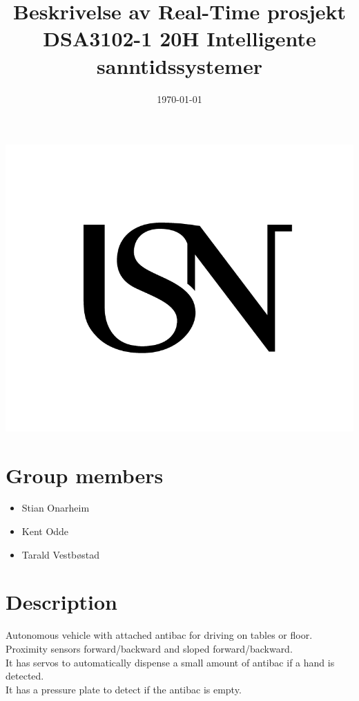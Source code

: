 \documentclass{article}
\title{Beskrivelse av Real-Time prosjekt \large\\
DSA3102-1 20H Intelligente sanntidssystemer}
\date{\today}
\begin{document}
\maketitle
\thispagestyle{empty}
\begin{center}
\includegraphics[width=\linewidth,height=0.2\textheight,keepaspectratio]{USN.png}
\end{center}


\newpage
\section{Group members}
	\begin{itemize}
		\item{Stian Onarheim}
		\item{Kent Odde}
		\item{Tarald Vestbøstad}
	\end{itemize}
\section{Description}
	Autonomous vehicle with attached antibac for driving on tables or floor.\\
	Proximity sensors forward/backward and sloped forward/backward.\\
	It has servos to automatically dispense a small amount of antibac if a hand is detected.\\
	It has a pressure plate to detect if the antibac is empty.
\end{document}
